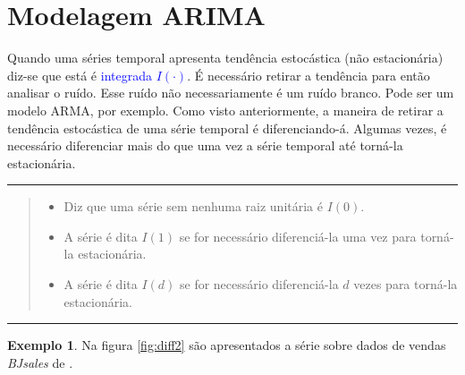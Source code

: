 \documentclass[
]{book}
\providecommand{\tightlist}{%
  \setlength{\itemsep}{0pt}\setlength{\parskip}{0pt}}
\theoremstyle{definition}
\theoremstyle{definition}
\newtheorem{example}{Exemplo}[chapter]
\theoremstyle{definition}
\theoremstyle{remark}
\begin{document}
\pagebreak

\hypertarget{modelagem-arima}{%
\section{Modelagem ARIMA}\label{modelagem-arima}}

Quando uma séries temporal apresenta tendência estocástica (não estacionária) diz-se que está é \textcolor{blue}{integrada $I(\cdot)$}. É necessário retirar a tendência para então analisar o ruído. Esse ruído não necessariamente é um ruído branco. Pode ser um modelo ARMA, por exemplo. Como visto anteriormente, a maneira de retirar a tendência estocástica de uma série temporal é diferenciando-á. Algumas vezes, é necessário diferenciar mais do que uma vez a série temporal até torná-la estacionária.

\begin{center}\rule{0.5\linewidth}{0.5pt}\end{center}

\begin{quote}
\begin{itemize}
\tightlist
\item
  Diz que uma série sem nenhuma raiz unitária é \(I(0)\).
\item
  A série é dita \(I(1)\) se for necessário diferenciá-la uma vez para torná-la estacionária.
\item
  A série é dita \(I(d)\) se for necessário diferenciá-la \(d\) vezes para torná-la estacionária.
\end{itemize}
\end{quote}

\begin{center}\rule{0.5\linewidth}{0.5pt}\end{center}

\begin{example}
\protect\hypertarget{exm:exempbj}{}{\label{exm:exempbj} }Na figura \ref{fig:diff2} são apresentados a série sobre dados de vendas \emph{BJsales} de \citep{box1970}.
\end{example}
\end{document}
